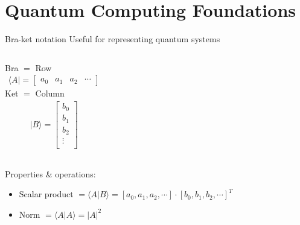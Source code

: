 \section[Quantum Computing Foundations]{Quantum Computing Foundations}

\begin{frame}{Bra-ket notation}
    Useful for representing quantum systems
		\begin{columns}[T,onlytextwidth]
			\centering
			Bra $=$ Row
			\begin{align*}
			    \langle A\rvert
			     = 
                \begin{bmatrix}
                a_{0} & a_{1} & a_{2} & \cdots
                \end{bmatrix}
            \end{align*}
			\centering
			Ket $=$ Column
            \begin{align*}
			    \lvert B\rangle
			     = 
                \begin{bmatrix}
                b_{0} \\
                b_{1} \\
                b_{2} \\
                \vdots \\
                \end{bmatrix}
            \end{align*}
		\end{columns}
		Properties \& operations:
		\begin{itemize}
			\item Scalar product $= \langle A\lvert B \rangle = [a_{0}, a_{1}, a_{2}, \cdots] \cdot [b_{0}, b_{1}, b_{2}, \cdots]^T$ 
			\item Norm $= \langle A\lvert A \rangle = |A|^2$
		\end{itemize}
    
\end{frame}


